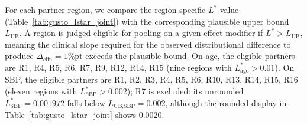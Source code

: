 \documentclass[AMA,Times1COL]{WileyNJDv5}
\begin{document}
For each partner region, we compare the region-specific $L^*$ value (Table~\ref{tab:gusto_lstar_joint}) with the corresponding plausible upper bound $L_{\text{UB}}$. A region is judged eligible for pooling on a given effect modifier if $L^* > L_{\text{UB}}$, meaning the clinical slope required for the observed distributional difference to produce $\Delta_{\text{clin}} = 1$\%pt exceeds the plausible bound. On age, the eligible partners are R1, R4, R5, R6, R7, R9, R12, R14, R15 (nine regions with $L^*_{\text{age}} > 0.01$). On SBP, the eligible partners are R1, R2, R3, R4, R5, R6, R10, R13, R14, R15, R16 (eleven regions with $L^*_{\text{SBP}} > 0.002$); R7 is excluded: its unrounded $L^*_{\text{SBP}} = 0.001972$ falls below $L_{\text{UB,SBP}} = 0.002$, although the rounded display in Table~\ref{tab:gusto_lstar_joint} shows 0.0020.
\end{document}
